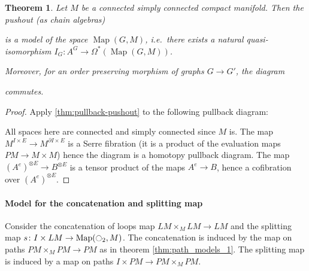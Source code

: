 \documentclass{scrartcl}
\theoremstyle{plain}
\newtheorem{theorem}{Theorem}[section]
\theoremstyle{definition}
\DeclareMathOperator{\Map}{Map}
\begin{document}
\begin{theorem}\label{thm:graph-mapping-space}
    Let $M$ be a connected simply connected compact manifold. Then the pushout (as chain algebras)
    \begin{center}
    \end{center}
    is a model of the space $\Map(G, M)$, i.e.\ there exists a natural quasi-isomorphism
    $I_G\colon A^G \to \Omega^*(\Map(G, M))$.
    
    Moreover, for an order preserving morphism of graphs $G\to G'$, the diagram
    \begin{center}
    \end{center}
    commutes.
\end{theorem}
\begin{proof}
    Apply \ref{thm:pullback-pushout} to the following pullback diagram:
    \begin{center}
    \end{center}
    All spaces here are connected and simply connected since $M$ is. The map $M^{I\times E} \to M^{\partial I\times E}$ is a Serre fibration (it is a product of the evaluation maps $PM\to M\times M$) hence the diagram is a homotopy pullback diagram. The map $(A^e)^{\otimes E} \to B^{\otimes E}$ is a tensor product of the maps $A^e\to B$, hence a cofibration over $(A^e)^{\otimes E}$.
\end{proof}


\paragraph{Model for the concatenation and splitting map} Consider the concatenation of loops map $LM\times_M LM\to LM$ and the splitting map $s\colon I\times LM\to \Map(\ocircle_2, M)$. The concatenation is induced by the map on paths $PM\times_M PM \to PM$ as in theorem \ref{thm:path_models_1}. The splitting map is induced by a map on paths $I\times PM \to PM\times_M PM$.
\end{document}
